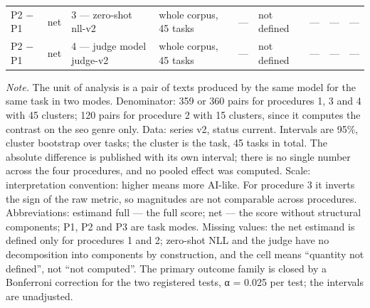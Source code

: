 \begin{table}[htbp]
\begin{tabular}{lllllllll}
P2 − P1 & net & 3 — zero-shot nll-v2 & whole corpus, 45 tasks & — & not defined & — & — & — \\
P2 − P1 & net & 4 — judge model judge-v2 & whole corpus, 45 tasks & — & not defined & — & — & — \\
\bottomrule
\end{tabular}
\begin{minipage}{\linewidth}\footnotesize\vspace{2pt}
\textit{Note.} The unit of analysis is a pair of texts produced by the same model for the same task in two modes. Denominator: 359 or 360 pairs for procedures 1, 3 and 4 with 45 clusters; 120 pairs for procedure 2 with 15 clusters, since it computes the contrast on the seo genre only. Data: series v2, status current. Intervals are 95\%, cluster bootstrap over tasks; the cluster is the task, 45 tasks in total. The absolute difference is published with its own interval; there is no single number across the four procedures, and no pooled effect was computed. Scale: interpretation convention: higher means more AI-like. For procedure 3 it inverts the sign of the raw metric, so magnitudes are not comparable across procedures. Abbreviations: estimand full — the full score; net — the score without structural components; P1, P2 and P3 are task modes. Missing values: the net estimand is defined only for procedures 1 and 2; zero-shot NLL and the judge have no decomposition into components by construction, and the cell means ``quantity not defined'', not ``not computed''. The primary outcome family is closed by a Bonferroni correction for the two registered tests, α = 0.025 per test; the intervals are unadjusted.
\end{minipage}
\end{table}

